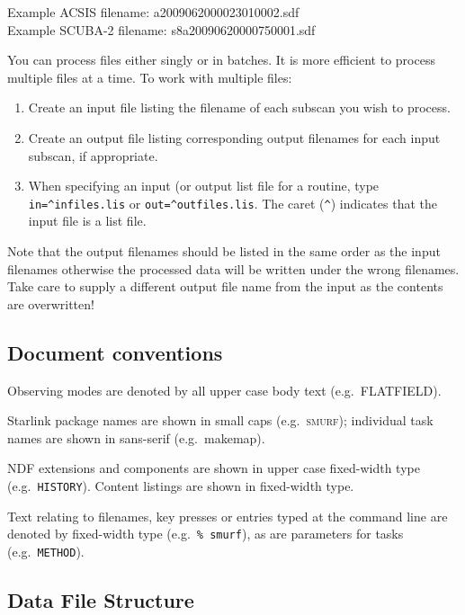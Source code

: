 \documentclass[twoside,11pt]{article}
\renewcommand{\_}{\texttt{\symbol{95}}}
\begin{document}
Example ACSIS filename: a20090620\_00023\_01\_0002.sdf\\
Example SCUBA-2 filename: s8a20090620\_00075\_0001.sdf

You can process files either singly or in batches. It is more
efficient to process multiple files at a time. To work with multiple
files:
\begin{enumerate}
\item Create an input file listing the filename of each subscan you
  wish to process.
\item Create an output file listing corresponding output filenames for
  each input subscan, if appropriate.
\item When specifying an input (or output list file for a routine,
  type \verb+in=^infiles.lis+ or \verb+out=^outfiles.lis+. The caret
  (\verb+^+) indicates that the input file is a list file.
\end{enumerate}
Note that the output filenames should be listed in the same order as
the input filenames otherwise the processed data will be written under
the wrong filenames. Take care to supply a different output file name
from the input as the contents are overwritten!

\subsection{Document conventions}

Observing modes are denoted by all upper case body text (e.g.\
FLATFIELD).

Starlink package names are shown in small caps (e.g.\ \textsc{smurf});
individual task names are shown in sans-serif (e.g.\ \textsf{makemap}).

NDF extensions and components are shown in upper case fixed-width type
(e.g.\ \texttt{HISTORY}). Content listings are shown in fixed-width type.

Text relating to filenames, key presses or entries typed at the
command line are denoted by fixed-width type (e.g.\ \texttt{\%
  smurf}), as are parameters for tasks (e.g.\ \texttt{METHOD}).


\subsection{Data File Structure}
\end{document}
